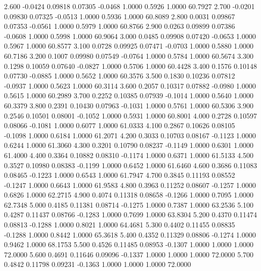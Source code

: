   2.600  -0.0424   0.09818   0.07305  -0.0468   1.0000   0.5926   1.0000  60.7927
   2.700  -0.0201   0.09830   0.07325  -0.0513   1.0000   0.5936   1.0000  60.8089
   2.800   0.0031   0.09867   0.07353  -0.0561   1.0000   0.5979   1.0000  60.8766
   2.900   0.0263   0.09899   0.07386  -0.0608   1.0000   0.5998   1.0000  60.9064
   3.000   0.0485   0.09908   0.07420  -0.0653   1.0000   0.5967   1.0000  60.8577
   3.100   0.0728   0.09925   0.07471  -0.0703   1.0000   0.5880   1.0000  60.7186
   3.200   0.1007   0.09980   0.07549  -0.0764   1.0000   0.5784   1.0000  60.5674
   3.300   0.1298   0.10059   0.07640  -0.0827   1.0000   0.5706   1.0000  60.4428
   3.400   0.1576   0.10148   0.07730  -0.0885   1.0000   0.5652   1.0000  60.3576
   3.500   0.1830   0.10236   0.07812  -0.0937   1.0000   0.5623   1.0000  60.3114
   3.600   0.2057   0.10317   0.07882  -0.0980   1.0000   0.5615   1.0000  60.2989
   3.700   0.2252   0.10385   0.07939  -0.1014   1.0000   0.5640   1.0000  60.3379
   3.800   0.2391   0.10430   0.07963  -0.1031   1.0000   0.5761   1.0000  60.5306
   3.900   0.2546   0.10501   0.08001  -0.1052   1.0000   0.5931   1.0000  60.8001
   4.000   0.2728   0.10597   0.08066  -0.1081   1.0000   0.6077   1.0000  61.0333
   4.100   0.2867   0.10626   0.08105  -0.1098   1.0000   0.6184   1.0000  61.2071
   4.200   0.3033   0.10703   0.08167  -0.1123   1.0000   0.6244   1.0000  61.3060
   4.300   0.3201   0.10790   0.08237  -0.1149   1.0000   0.6301   1.0000  61.4000
   4.400   0.3364   0.10882   0.08310  -0.1174   1.0000   0.6371   1.0000  61.5133
   4.500   0.3527   0.10980   0.08383  -0.1199   1.0000   0.6452   1.0000  61.6460
   4.600   0.3686   0.11083   0.08465  -0.1223   1.0000   0.6543   1.0000  61.7947
   4.700   0.3845   0.11193   0.08552  -0.1247   1.0000   0.6643   1.0000  61.9583
   4.800   0.3963   0.11252   0.08607  -0.1257   1.0000   0.6826   1.0000  62.2715
   4.900   0.4074   0.11318   0.08658  -0.1266   1.0000   0.7095   1.0000  62.7348
   5.000   0.4185   0.11381   0.08714  -0.1275   1.0000   0.7387   1.0000  63.2536
   5.100   0.4287   0.11437   0.08766  -0.1283   1.0000   0.7699   1.0000  63.8304
   5.200   0.4370   0.11474   0.08813  -0.1288   1.0000   0.8021   1.0000  64.4681
   5.300   0.4402   0.11455   0.08835  -0.1288   1.0000   0.8442   1.0000  65.3618
   5.400   0.4352   0.11329   0.08806  -0.1274   1.0000   0.9462   1.0000  68.1753
   5.500   0.4526   0.11485   0.08953  -0.1307   1.0000   1.0000   1.0000  72.0000
   5.600   0.4691   0.11646   0.09096  -0.1337   1.0000   1.0000   1.0000  72.0000
   5.700   0.4842   0.11798   0.09231  -0.1363   1.0000   1.0000   1.0000  72.0000
